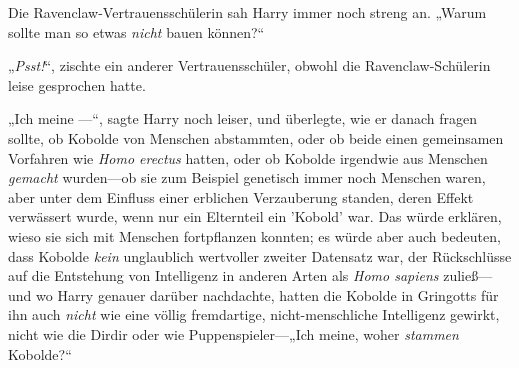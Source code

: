 Die Ravenclaw-Vertrauensschülerin sah Harry immer noch streng an. „Warum sollte man so etwas \emph{nicht} bauen können?“

„\emph{Psst!}“, zischte ein anderer Vertrauensschüler, obwohl die Ravenclaw-Schülerin leise gesprochen hatte.

„Ich meine —“, sagte Harry noch leiser, und überlegte, wie er danach fragen sollte, ob Kobolde von Menschen abstammten, oder ob beide einen gemeinsamen Vorfahren wie \emph{Homo erectus} hatten, oder ob Kobolde irgendwie aus Menschen \emph{gemacht} wurden—ob sie zum Beispiel genetisch immer noch Menschen waren, aber unter dem Einfluss einer erblichen Verzauberung standen, deren Effekt verwässert wurde, wenn nur ein Elternteil ein 'Kobold' war. Das würde erklären, wieso sie sich mit Menschen fortpflanzen konnten; es würde aber auch bedeuten, dass Kobolde \emph{kein} unglaublich wertvoller zweiter Datensatz war, der Rückschlüsse auf die Entstehung von Intelligenz in anderen Arten als \emph{Homo sapiens} zuließ—und wo Harry genauer darüber nachdachte, hatten die Kobolde in Gringotts für ihn auch \emph{nicht} wie eine völlig fremdartige, nicht-menschliche Intelligenz gewirkt, nicht wie die Dirdir oder wie Puppenspieler—„Ich meine, woher \emph{stammen} Kobolde?“




